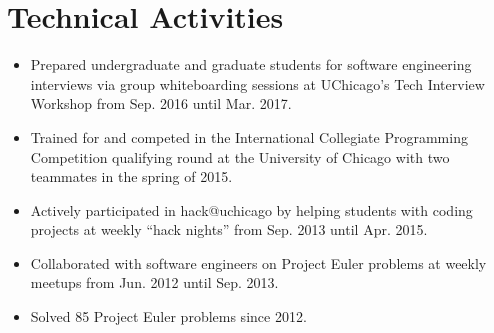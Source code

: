 \documentclass[letterpaper,11pt]{article}
\newcommand{\resumeItem}[1]{
  \item\small{#1 \vspace{-2pt}}
}
\newcommand{\resumeSubHeadingListStart}{\begin{itemize}[leftmargin=*]}
\newcommand{\resumeSubHeadingListEnd}{\end{itemize}}
\begin{document}

\section{Technical Activities}
  \resumeSubHeadingListStart
    \resumeItem{Prepared undergraduate and graduate students for software engineering interviews via group whiteboarding sessions at UChicago's Tech Interview Workshop from Sep. 2016 until Mar. 2017.}
    \resumeItem{Trained for and competed in the International Collegiate Programming Competition qualifying round at the University of Chicago with two teammates in the spring of 2015.}
    \resumeItem{Actively participated in hack@uchicago by helping students with coding projects at weekly ``hack nights'' from Sep. 2013 until Apr. 2015.}
    \resumeItem{Collaborated with software engineers on Project Euler problems at weekly meetups from Jun. 2012 until Sep. 2013.}
    \resumeItem{Solved 85 Project Euler problems since 2012.}
  \resumeSubHeadingListEnd
\end{document}
